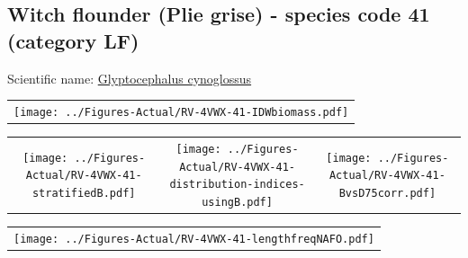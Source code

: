 \documentclass[12pt]{article}\usepackage[]{graphicx}\usepackage[]{color}
\begin{document}
\renewcommand\thefigure{\thesubsection\Alph{figure}}

\setcounter{figure}{0}

\hypertarget{sec:41}{%
\subsection{Witch flounder (Plie grise) - species code 41 (category LF)}\label{sec:41}}

  


Scientific name: \href{http://www.marinespecies.org/aphia.php?p=taxdetails\&id=127136}{Glyptocephalus cynoglossus} \newline
\begin{minipage}{1.0\textwidth}
 \begin{tabular}{c}
\texttt{[image: ../Figures-Actual/RV-4VWX-41-IDWbiomass.pdf]} \\ 
\end{tabular} 
\end{minipage}
\newline

\vspace{1cm}
\begin{minipage}{1.0\textwidth}
 \begin{tabular}{ccc}
\texttt{[image: ../Figures-Actual/RV-4VWX-41-stratifiedB.pdf]} & 
\texttt{[image: ../Figures-Actual/RV-4VWX-41-distribution-indices-usingB.pdf]} & 
\texttt{[image: ../Figures-Actual/RV-4VWX-41-BvsD75corr.pdf]} \\ 
\end{tabular} 
\end{minipage}
\clearpage
\begin{minipage}{1.0\textwidth}
 \begin{tabular}{c}
\texttt{[image: ../Figures-Actual/RV-4VWX-41-lengthfreqNAFO.pdf]} \\ 
\end{tabular} 
\end{minipage}
\newline
\end{document}
